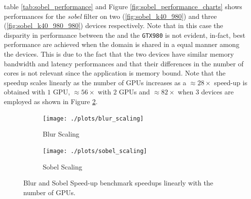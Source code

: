 table \ref{tab:sobel_performance} and Figure \ref{fig:sobel_performance_charts} shows performances for the \textit{sobel} filter on two (\ref{fig:sobel_k40_980}) and three (\ref{fig:sobel_k40_980_980}) devices respectively.
Note that in this case the disparity in performance between the  and the \texttt{GTX980} is not evident, in-fact, best performance are achieved when the domain is shared in a equal manner among the devices. This is due to the fact that the two devices have similar memory bandwidth and latency performances and that their differences in the number of cores is not relevant since the application is memory bound.
Note that the speedup scales linearly as the number of GPUs increases as a $\approx 28 \times$ speed-up is obtained with $1$ GPU, $\approx 56 \times$ with $2$ GPUs and  $\approx 82 \times$ when $3$ devices are employed as shown in Figure \ref{fig:sobel_scaling}.




\begin{figure}

	\begin{subfigure}{1.0\textwidth}
		\caption{Blur Scaling}
		\label{fig:blur_scaling}
	\texttt{[image: ./plots/blur\_scaling]}
	\end{subfigure}		
	\endminipage

	\begin{subfigure}{1.0\textwidth}
		\caption{Sobel Scaling}
		\label{fig:sobel_scaling}
		\texttt{[image: ./plots/sobel\_scaling]}
	\end{subfigure}
	\endminipage\hfill
	\caption[]{Blur and Sobel Speed-up benchmark speedups linearly with the number of GPUs. }
	\label{fig:scaling}
\end{figure}



